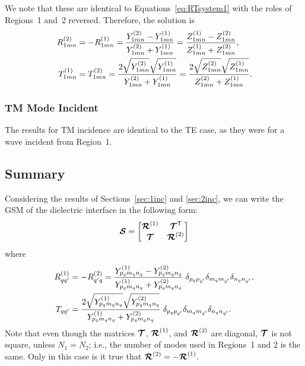 We note that these are identical to Equations~\eqref{eq:RTsystem1}
with the roles of Regions~1 and~2 reversed.  Therefore, the solution is
\begin{align}
  R^{(2)}_{1mn} &= 
  -R^{(1)}_{1mn} = 
  \frac{Y^{(2)}_{1mn} - Y^{(1)}_{1mn}}{Y^{(2)}_{1mn} + Y^{(1)}_{1mn}} 
  = \frac{Z^{(1)}_{1mn} - Z^{(2)}_{1mn}}{Z^{(1)}_{1mn} + Z^{(2)}_{1mn}}, \\
   T^{(1)}_{1mn} &= 
   T^{(2)}_{1mn} = 
   \frac{2\sqrt{Y^{(2)}_{1mn}}\sqrt{Y^{(1)}_{1mn}}}{Y^{(2)}_{1mn}+Y^{(1)}_{1mn}}
  = \frac{2\sqrt{Z^{(2)}_{1mn}}\sqrt{Z^{(1)}_{1mn}}}{Z^{(2)}_{1mn}+Z^{(1)}_{1mn}}.
\end{align}

\subsubsection{TM Mode Incident}
\label{sec:2incTM}
The results for TM incidence are identical to the TE case, as they
were for a wave incident from Region~1.

\subsection{Summary}  Considering the results of
Sections~\ref{sec:1inc} and \ref{sec:2inc}, we can write the
GSM of the dielectric interface in the following form:
\begin{equation}
  \boldsymbol{\mathcal{S}} = 
  \begin{bmatrix}
    \boldsymbol{\mathcal{R}}^{(1)} & \boldsymbol{\mathcal{T}}^{\text{\sffamily{T}}} \\
    \boldsymbol{\mathcal{T}} & \boldsymbol{\mathcal{R}}^{(2)}
  \end{bmatrix}
\end{equation}
where
\begin{subequations}
  \begin{align}
    R\one_{qq'} &= -R\two_{q'q} =
      \frac{Y\one_{p_q m_q n_q} - Y\two_{p_q m_q n_q}}%
        {Y\one_{p_q m_q n_q} + Y\two_{p_q m_q n_q}} \;
        \delta_{p_q p_{q'}} \delta_{m_q m_{q'}} \delta_{n_q n_{q'}}, \\
   T_{qq'} &= 
   \frac{2\sqrt{Y\one_{p_{q}m_{q}n_{q}}}\sqrt{Y\two_{p_{q}m_{q}n_{q}}}}
      {Y\one_{p_{q}m_{q}n_{q}}+Y\two_{p_{q}m_{q}n_{q}}} \;
      \delta_{p_q p_{q'}} \delta_{m_q m_{q'}} \delta_{n_q n_{q'}}.
             \label{eq:Tsummary}
  \end{align}
\end{subequations}
Note that even though the matrices $\boldsymbol{\mathcal{T}}$,
$\boldsymbol{\mathcal{R}}^{(1)}$, and $\boldsymbol{\mathcal{R}}^{(2)}$ are diagonal, $\boldsymbol{\mathcal{T}}$ is not
square, 
unless $N_1 = N_2$; i.e., the number of modes used
in Regions~1 and 2 is the same.  Only in this case
is it true that $\boldsymbol{\mathcal{R}}^{(2)} = -\boldsymbol{\mathcal{R}}^{(1)}$.

